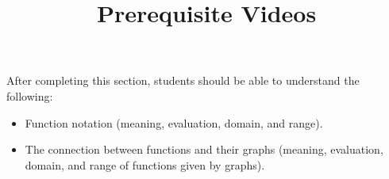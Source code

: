 \documentclass{ximera}
\title{Prerequisite Videos}
\begin{document}
\begin{abstract}
\end{abstract}

\maketitle

\begin{sectionOutcomes}
After completing this section, students should be able to understand the following:

\begin{itemize}
	\item Function notation (meaning, evaluation, domain, and range).
    \item The connection between functions and their graphs (meaning, evaluation, domain, and range of functions given by graphs).
\end{itemize}


\end{sectionOutcomes}
\end{document}
